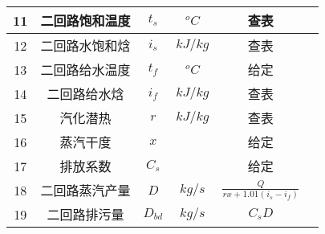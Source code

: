 \begin{table}[H]
{\begin{tabular}{|c|c|c|c|c|c|}
            11   & 二回路饱和温度   & $ t_s $        & $ ^oC $   & 查表                                                                                           &      \\ \hline
            12   & 二回路水饱和焓   & $ i_s $        & $ kJ/kg $ & 查表                                                                                           &      \\ \hline
            13   & 二回路给水温度   & $ t_f $        & $ ^oC $   & 给定                                                                                           &      \\ \hline
            14   & 二回路给水焓     & $ i_f $        & $ kJ/kg $ & 查表                                                                                           &      \\ \hline
            15   & 汽化潜热         & $ r $          & $ kJ/kg $ & 查表                                                                                           &      \\ \hline
            16   & 蒸汽干度         & $ x $          &           & 给定                                                                                           &      \\ \hline
            17   & 排放系数         & $ C_s $        &           & 给定                                                                                           &      \\ \hline
            18   & 二回路蒸汽产量   & $ D $          & $ kg/s $  & $ \frac{Q}{r x+1.01\left(i_{s}-i_{f}\right)} $                                                 &      \\ \hline
            19   & 二回路排污量     & $ D_{bd} $     & $ kg/s $  & $ C_s D $                                                                                      &      \\ \hline
        \end{tabular}
    }
\end{table}

